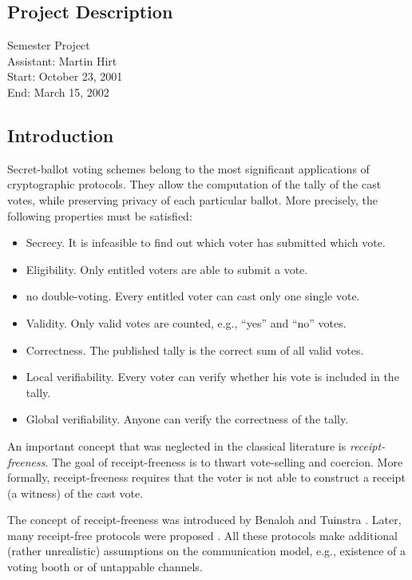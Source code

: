 \documentclass{article}
\begin{document}
\begin{appendix}

\section{Project Description}

\begin{flushleft}
Semester Project\\
Assistant: Martin Hirt\\
Start: October 23, 2001\\
End: March 15, 2002
\end{flushleft}


\subsection{Introduction}
Secret-ballot voting schemes belong to the most significant applications of
cryptographic protocols. They allow the computation of the tally of the
cast votes, while preserving privacy of each particular ballot. More
precisely, the following properties must be satisfied:
\begin{itemize}\itemsep=0pt\parsep=0pt
\item {\sc Secrecy.} It is infeasible to find out which voter has submitted
  which vote.
\item {\sc Eligibility.} Only entitled voters are able to submit a vote.
\item {\sc no double-voting.} Every entitled voter can cast only one single
  vote.
\item {\sc Validity.} Only valid votes are counted, e.g., ``yes'' and
  ``no'' votes.
\item {\sc Correctness.} The published tally is the correct sum of all
  valid votes.
\item {\sc Local verifiability.} Every voter can verify whether his vote
  is included in the tally.
\item {\sc Global verifiability.} Anyone can verify the correctness of the
  tally.
\end{itemize}

An important concept that was neglected in the classical literature is
{\em receipt-freeness}. The goal of receipt-freeness is to thwart
vote-selling and coercion. More formally, receipt-freeness requires that
the voter is not able to construct a receipt (a witness) of the cast vote.

The concept of receipt-freeness was introduced by Benaloh and Tuinstra
\cite{BenTui94}. Later, many receipt-free protocols were proposed
\cite{SakKil95,Okamot96,Okamot97,HirSak00,LeeKim00,Hirt01,BPPSF01}.  All
these protocols make additional (rather unrealistic) assumptions on the
communication model, e.g., existence of a voting booth or of untappable
channels.


\end{appendix}
\end{document}
